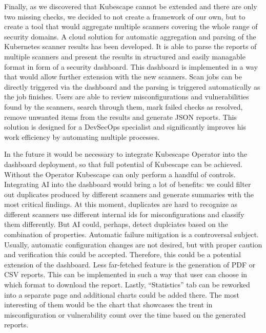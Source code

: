 Finally, as we discovered that Kubescape cannot be extended and there are only two missing checks, we decided to not create a framework of our own, but to create a tool that would aggregate multiple scanners covering the whole range of security domains. A cloud solution for automatic aggregation and parsing of the Kubernetes scanner results has been developed. It is able to parse the reports of multiple scanners and present the results in structured and easily managable format in form of a security dashboard. This dashboard is implemented in a way that would allow further extension with the new scanners. Scan jobs can be directly triggered via the dashboard and the parsing is triggered automatically as the job finishes. Users are able to review misconfigurations and vulnerabilities found by the scanners, search through them, mark failed checks as resolved, remove unwanted items from the results and generate JSON reports. This solution is designed for a DevSecOps specialist and significantly improves his work efficiency by automating multiple processes.

In the future it would be necessary to integrate Kubescape Operator into the dashboard deployment, so that full potential of Kubescape can be achieved. Without the Operator Kubescape can only perform a handful of controls. Integrating AI into the dashboard would bring a lot of benefits: we could filter out duplicates produced by different scanners and generate summaries with the most critical findings. At this moment, duplicates are hard to recognize as different scanners use different internal ids for misconfigurations and classify them differently. But AI could, perhaps, detect duplciates based on the combination of properties. Automatic failure mitigation is a controversal subject. Usually, automatic configuration changes are not desired, but with proper caution and verification this could be accepted. Therefore, this could be a potential extension of the dashboard. Less far-fetched feature is the generation of PDF or CSV reports. This can be implemented in such a way that user can choose in which format to download the report. Lastly, ``Statistics'' tab can be reworked into a separate page and additional charts could be added there. The most interesting of them would be the chart that showcases the trent in misconfiguration or vulnerability count over the time based on the generated reports.